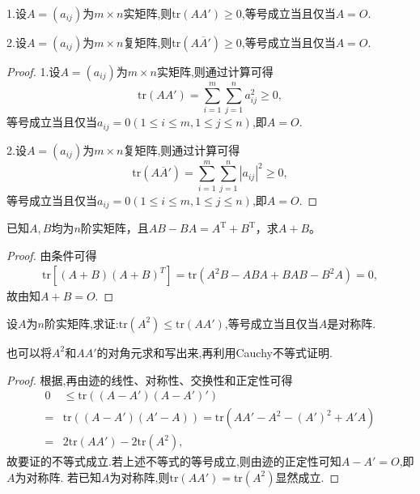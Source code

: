 \documentclass[../../main.tex]{subfiles}
\begin{document}
\begin{proposition}\label{proposition:矩阵与其转置乘积的迹}
1.设\(A=(a_{ij})\)为\(m\times n\)实矩阵,则\(\mathrm{tr}(AA')\geqslant 0\),等号成立当且仅当\(A = O\).

2.设\(A=(a_{ij})\)为\(m\times n\)复矩阵,则\(\mathrm{tr}(A\overline{A}')\geqslant 0\),等号成立当且仅当\(A = O\).
\end{proposition}
\begin{proof}
1.设\(A=(a_{ij})\)为\(m\times n\)实矩阵,则通过计算可得
\[
\mathrm{tr}(AA')=\sum_{i = 1}^{m}\sum_{j = 1}^{n}a_{ij}^2\geqslant 0,
\]
等号成立当且仅当\(a_{ij}=0(1\leqslant  i\leqslant  m,1\leqslant  j\leqslant  n)\),即\(A = O\).

2.设\(A=(a_{ij})\)为\(m\times n\)复矩阵,则通过计算可得
\[
\mathrm{tr}(A\overline{A}')=\sum_{i = 1}^{m}\sum_{j = 1}^{n}|a_{ij}|^2\geqslant 0,
\]
等号成立当且仅当\(a_{ij}=0(1\leqslant  i\leqslant  m,1\leqslant  j\leqslant  n)\),即\(A = O\).

\end{proof}

\begin{example}
已知\( A,B \)均为\( n \)阶实矩阵，且\( AB - BA = A^{\text{T}} + B^{\text{T}} \)，求\( A + B \)。
\end{example}
\begin{proof}
由条件可得
\begin{align*}
\mathrm{tr}\left[ \left( A+B \right) \left( A+B \right) ^T \right] =\mathrm{tr}\left( A^2B-ABA+BAB-B^2A \right) =0,
\end{align*}
故由知$A+B=O.$

\end{proof}

\begin{proposition}\label{proposition:矩阵迹的不等式}
设\(A\)为\(n\)阶实矩阵,求证:\(\mathrm{tr}(A^2)\leqslant \mathrm{tr}(AA')\),等号成立当且仅当\(A\)是对称阵.
\end{proposition}
\begin{note}
也可以将$A^2$和$AA'$的对角元求和写出来,再利用Cauchy不等式证明.
\end{note}
\begin{proof}
根据,再由迹的线性、对称性、交换性和正定性可得
\begin{align*}
0&\leqslant \mathrm{tr}((A - A')(A - A')')\\
=&\mathrm{tr}((A - A')(A' - A))=\mathrm{tr}(AA' - A^2 - (A')^2 + A'A)\\
=&2\mathrm{tr}(AA') - 2\mathrm{tr}(A^2),
\end{align*}
故要证的不等式成立.若上述不等式的等号成立,则由迹的正定性可知\(A - A' = O\),即\(A\)为对称阵.
若已知$A$为对称阵,则$\mathrm{tr}(AA') = \mathrm{tr}(A^2)$显然成立.

\end{proof}
\end{document}

